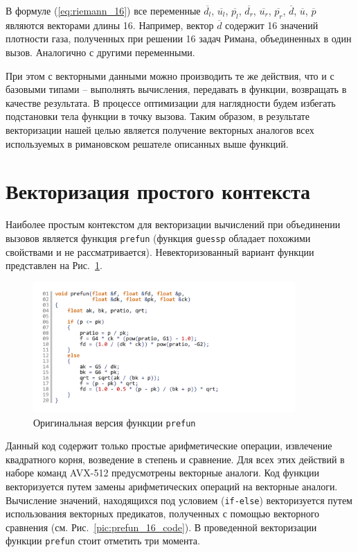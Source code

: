 \documentclass[utf8]{psta}
\begin{document}
В формуле (\ref{eq:riemann_16}) все переменные $\overline{d_l}$, $\overline{u_l}$, $\overline{p_l}$, $\overline{d_r}$, $\overline{u_r}$, $\overline{p_r}$, $\overline{d}$, $\overline{u}$, $\overline{p}$ являются векторами длины 16.
Например, вектор $\overline{d}$ содержит 16 значений плотности газа, полученных при решении 16 задач Римана, объединенных в один вызов.
Аналогично с другими переменными.

При этом с векторными данными можно производить те же действия, что и с базовыми типами -- выполнять вычисления, передавать в функции, возвращать в качестве результата.
В процессе оптимизации для наглядности будем избегать подстановки тела функции в точку вызова.
Таким образом, в результате векторизации нашей целью является получение векторных аналогов всех используемых в римановском решателе описанных выше функций.

\section{Векторизация простого контекста}

Наиболее простым контекстом для векторизации вычислений при объединении вызовов является функция \texttt{prefun} (функция \texttt{guessp} обладает похожими свойствами и не рассматривается).
Невекторизованный вариант функции представлен на Рис.~\ref{pic:prefun_code}.

\begin{figure}
\includegraphics[width=10cm]{pics/pic_prefun_code}
\caption{Оригинальная версия функции \texttt{prefun}}
\label{pic:prefun_code}
\end{figure}

Данный код содержит только простые арифметические операции, извлечение квадратного корня, возведение в степень и сравнение.
Для всех этих действий в наборе команд AVX-512 предусмотрены векторные аналоги.
Код функции векторизуется путем замены арифметических операций на векторные аналоги.
Вычисление значений, находящихся под условием (\texttt{if-else}) векторизуется путем использования векторных предикатов, полученных с помощью векторного сравнения (см. Рис.~\ref{pic:prefun_16_code}).
В проведенной векторизации функции \texttt{prefun} стоит отметить три момента.
\end{document}
